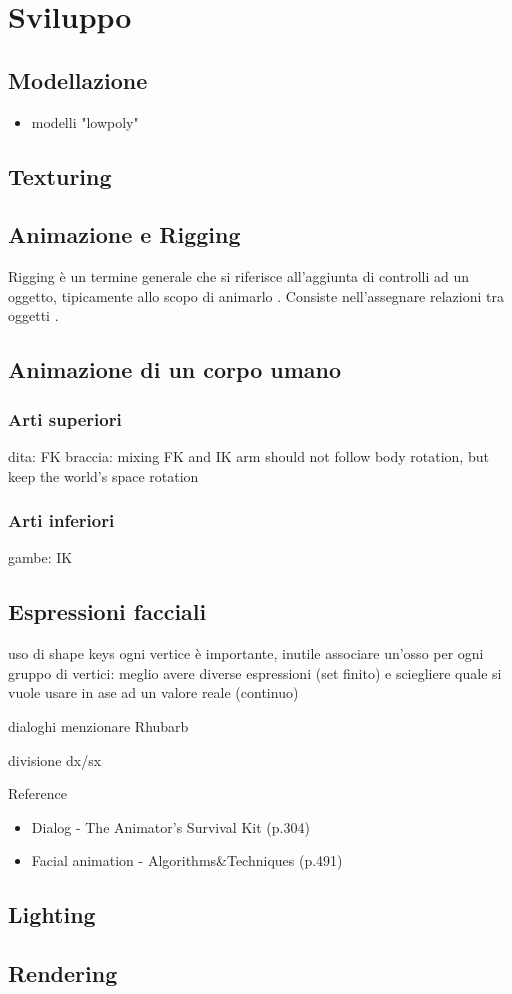 
\chapter{Sviluppo} %

\label{Chapter5} %


\section{Modellazione}
\begin{itemize}
    \item modelli "lowpoly"
\end{itemize}
\section{Texturing}
\section{Animazione e Rigging}
Rigging è un termine generale che si riferisce all'aggiunta di controlli ad un oggetto, tipicamente allo scopo di animarlo \parencite{blendDoc}.
Consiste nell'assegnare relazioni tra oggetti \parencite{BlendTut}.
\section{Animazione di un corpo umano}
\subsection{Arti superiori}
dita: FK
braccia: mixing FK and IK
         arm should not follow body rotation, but keep the world's space rotation
\subsection{Arti inferiori}
gambe: IK
\section{Espressioni facciali}
uso di shape keys
ogni vertice è importante, inutile associare un'osso per ogni gruppo di vertici: meglio avere diverse espressioni (set finito) e sciegliere quale si vuole usare in ase ad un valore reale (continuo)

dialoghi
menzionare Rhubarb

divisione dx/sx

Reference
\begin{itemize}
    \item Dialog - The Animator's Survival Kit (p.304) 
    \item Facial animation - Algorithms\&Techniques (p.491)
\end{itemize}
\section{Lighting}
\section{Rendering}


